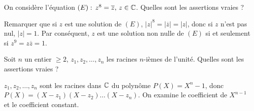 \begin{question} 

On considère l'équation $(E) : \, z^8= \overline{z}, \, z\in \mathbb{C}$. Quelles sont les assertions vraies ?
\begin{answers}
        
    
    
     

\end{answers}
\begin{explanations}
Remarquer que si $z$ est une solution  de $(E)$, $|z|^8=|\overline{z}|=|z|$, donc si $z$ n'est pas nul,  $|z|=1$.
Par conséquent, $z$ est une solution non nulle de $(E)$ si et seulement si  $z^9=z\overline{z}=1$.
\end{explanations}

\end{question}



\begin{question} 

Soit $n$ un entier $\ge 2$, $z_1,z_2, \dots, z_n$ les racines $n$-ièmes de l'unité. Quelles sont les assertions vraies ?
\begin{answers}
    
    
    
    
    
     

\end{answers}
\begin{explanations}
$z_1,z_2, \dots, z_n$ sont les racines dans $\mathbb{C}$ du polynôme $P(X) =X^n-1$, donc $P(X)=(X-z_1)(X-z_2)\dots (X-z_n)$. 
On examine le coefficient de $X^{n-1}$ et le coefficient constant.
\end{explanations}

\end{question}


